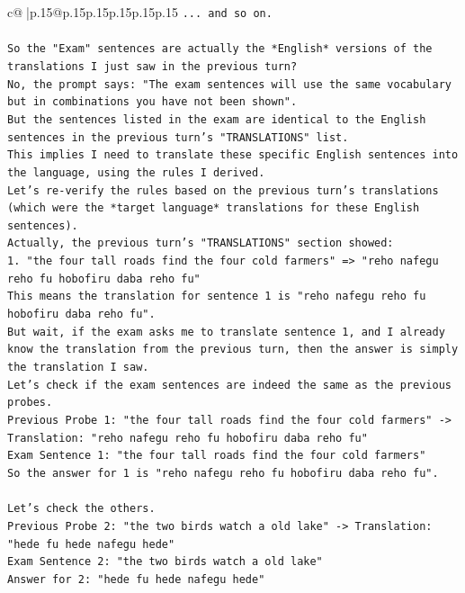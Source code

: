 \documentclass{article}
\begin{document}
{\begin{supertabular}{c@{$\;$}|p{.15\linewidth}@{}p{.15\linewidth}p{.15\linewidth}p{.15\linewidth}p{.15\linewidth}p{.15\linewidth}}
{{{\texttt{... and so on.} \\
\\ 
\texttt{So the "Exam" sentences are actually the *English* versions of the translations I just saw in the previous turn?} \\
\texttt{No, the prompt says: "The exam sentences will use the same vocabulary but in combinations you have not been shown".} \\
\texttt{But the sentences listed in the exam are identical to the English sentences in the previous turn's "TRANSLATIONS" list.} \\
\texttt{This implies I need to translate these specific English sentences into the language, using the rules I derived.} \\
\texttt{Let's re{-}verify the rules based on the previous turn's translations (which were the *target language* translations for these English sentences).} \\
\texttt{Actually, the previous turn's "TRANSLATIONS" section showed:} \\
\texttt{1. "the four tall roads find the four cold farmers" => "reho nafegu reho fu hobofiru daba reho fu"} \\
\texttt{This means the translation for sentence 1 is "reho nafegu reho fu hobofiru daba reho fu".} \\
\texttt{But wait, if the exam asks me to translate sentence 1, and I already know the translation from the previous turn, then the answer is simply the translation I saw.} \\
\texttt{Let's check if the exam sentences are indeed the same as the previous probes.} \\
\texttt{Previous Probe 1: "the four tall roads find the four cold farmers" {-}> Translation: "reho nafegu reho fu hobofiru daba reho fu"} \\
\texttt{Exam Sentence 1: "the four tall roads find the four cold farmers"} \\
\texttt{So the answer for 1 is "reho nafegu reho fu hobofiru daba reho fu".} \\
\\ 
\texttt{Let's check the others.} \\
\texttt{Previous Probe 2: "the two birds watch a old lake" {-}> Translation: "hede fu hede nafegu hede"} \\
\texttt{Exam Sentence 2: "the two birds watch a old lake"} \\
\texttt{Answer for 2: "hede fu hede nafegu hede"} \\
}}}
\end{supertabular}}
\end{document}
